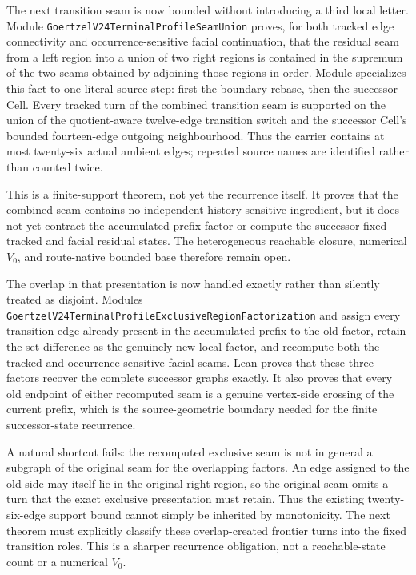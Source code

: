 \documentclass[11pt]{article}
\theoremstyle{definition}
\begin{document}
The next transition seam is now bounded without introducing a third local
letter.  Module
\texttt{GoertzelV24TerminalProfileSeamUnion} proves, for both tracked edge
connectivity and occurrence-sensitive facial continuation, that the residual
seam from a left region into a union of two right regions is contained in the
supremum of the two seams obtained by adjoining those regions in order.
Module
specializes this fact to one literal source step: first the boundary rebase,
then the successor Cell.  Every tracked turn of the combined transition seam
is supported on the union of the quotient-aware twelve-edge transition switch
and the successor Cell's bounded fourteen-edge outgoing neighbourhood.  Thus
the carrier contains at most twenty-six actual ambient edges; repeated source
names are identified rather than counted twice.

This is a finite-support theorem, not yet the recurrence itself.  It proves
that the combined seam contains no independent history-sensitive ingredient,
but it does not yet contract the accumulated prefix factor or compute the
successor fixed tracked and facial residual states.  The heterogeneous
reachable closure, numerical $V_0$, and route-native bounded base therefore
remain open.

The overlap in that presentation is now handled exactly rather than silently
treated as disjoint.  Modules
\texttt{GoertzelV24TerminalProfileExclusiveRegionFactorization} and
assign every transition edge already present in the accumulated prefix to the
old factor, retain the set difference as the genuinely new local factor, and
recompute both the tracked and occurrence-sensitive facial seams.  Lean proves
that these three factors recover the complete successor graphs exactly.  It
also proves that every old endpoint of either recomputed seam is a genuine
vertex-side crossing of the current prefix, which is the source-geometric
boundary needed for the finite successor-state recurrence.

A natural shortcut fails: the recomputed exclusive seam is not in general a
subgraph of the original seam for the overlapping factors.  An edge assigned
to the old side may itself lie in the original right region, so the original
seam omits a turn that the exact exclusive presentation must retain.  Thus the
existing twenty-six-edge support bound cannot simply be inherited by
monotonicity.  The next theorem must explicitly classify these overlap-created
frontier turns into the fixed transition roles.  This is a sharper recurrence
obligation, not a reachable-state count or a numerical $V_0$.
\end{document}
